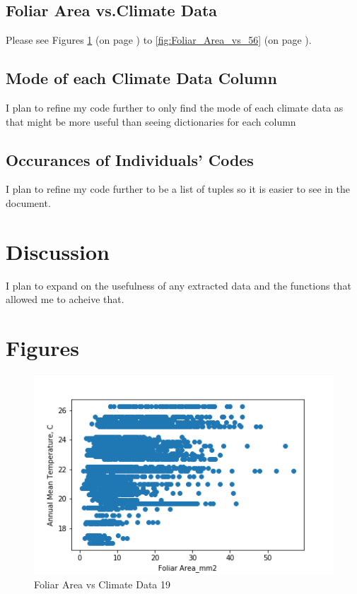 \documentclass[letterpaper]{article}
\begin{document}
\subsection{Foliar Area vs.Climate Data}
Please see Figures \ref{fig:Foliar_Area_vs_19} (on page \pageref{fig:Foliar_Area_vs_19}) to \ref{fig:Foliar_Area_vs_56} (on page \pageref{fig:Foliar_Area_vs_56}).
\subsection{Mode of each Climate Data Column}
I plan to refine my code further to only find the mode of each climate data as that might be more useful than seeing dictionaries for each column
\subsection{Occurances of Individuals' Codes}
I plan to refine my code further to be a list of tuples so it is easier to see in the document. 
\section{Discussion}
I plan to expand on the usefulness of any extracted data and the functions that allowed me to acheive that. 

\newpage




\newpage

\section*{Figures}

\begin{figure}[h]
\caption{Foliar Area vs Climate Data 19\label{fig:Foliar_Area_vs_19}}
\centering
\includegraphics[width=0.7\paperwidth]{Foliar_Area_vs_19}
\end{figure}
\end{document}
